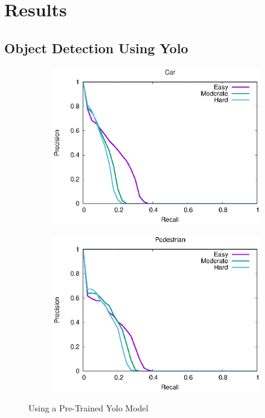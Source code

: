 \section{Results}

\subsection{Object Detection Using Yolo}
\begin{figure}[H]
\begin{subfigure}{.5\textwidth}
    \centering
    \includegraphics[width=1.0\linewidth]{img/yolo_Nov_4/plot_valid/car_detection.eps}
\end{subfigure}%
\begin{subfigure}{.5\textwidth}
    \centering
    \includegraphics[width=1.0\linewidth]{img/yolo_Nov_4/plot_valid/pedestrian_detection.eps}
\end{subfigure}
\caption{Using a Pre-Trained Yolo Model}
\end{figure}


